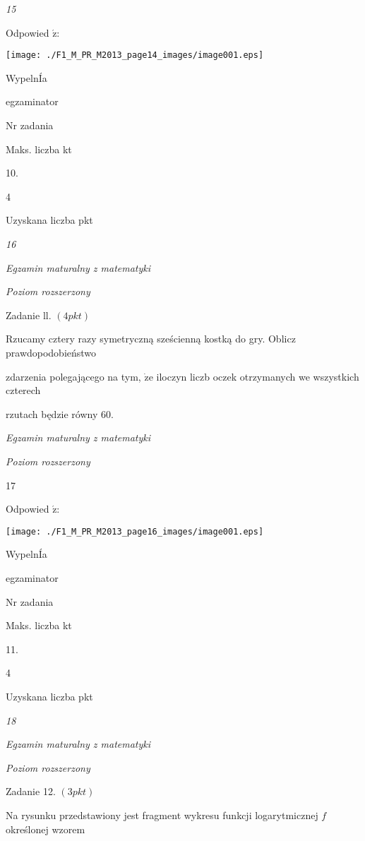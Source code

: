 \documentclass[a4paper,12pt]{article}
\begin{document}
{\it 15}

Odpowied $\acute{\mathrm{z}}$:
\begin{center}
\texttt{[image: ./F1\_M\_PR\_M2013\_page14\_images/image001.eps]}
\end{center}
WypelnÍa

egzaminator

Nr zadania

Maks. liczba kt

10.

4

Uzyskana liczba pkt





{\it 16}

{\it Egzamin maturalny z matematyki}

{\it Poziom rozszerzony}

Zadanie ll. $(4pkt)$

Rzucamy cztery razy symetryczną sześcienną kostką do gry. Oblicz prawdopodobieństwo

zdarzenia polegającego na tym, $\dot{\mathrm{z}}\mathrm{e}$ iloczyn liczb oczek otrzymanych we wszystkich czterech

rzutach będzie równy 60.





{\it Egzamin maturalny z matematyki}

{\it Poziom rozszerzony}

17

Odpowied $\acute{\mathrm{z}}$:
\begin{center}
\texttt{[image: ./F1\_M\_PR\_M2013\_page16\_images/image001.eps]}
\end{center}
WypelnÍa

egzaminator

Nr zadania

Maks. liczba kt

11.

4

Uzyskana liczba pkt





{\it 18}

{\it Egzamin maturalny z matematyki}

{\it Poziom rozszerzony}

Zadanie 12. $(3pkt)$

Na rysunku przedstawiony jest fragment wykresu funkcji logarytmicznej $f$ określonej wzorem
\end{document}
